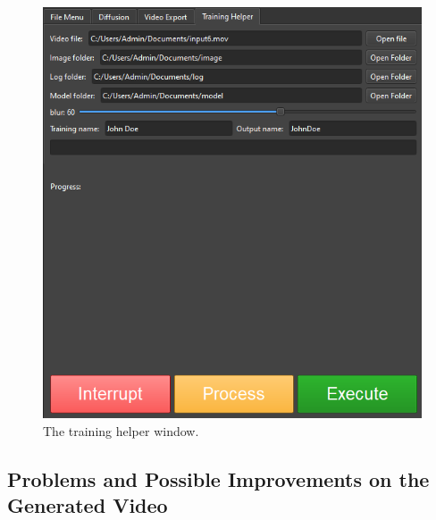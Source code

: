 \documentclass[preprint]{elsarticle}
\begin{document}
\begin{figure}[t]
	\centering
	\includegraphics[scale=0.44, keepaspectratio]{img/project_img/training-help.png}
	\caption{The training helper window.}\label{fig:training-helper}
\end{figure}



\subsection{Problems and Possible Improvements on the Generated Video}
\end{document}
